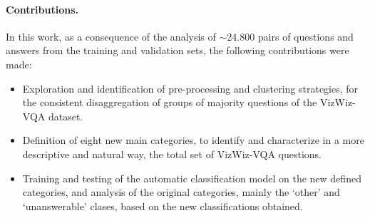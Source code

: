 \paragraph{\textbf{Contributions.}}
In this work, as a consequence of the analysis of $\sim$24.800 pairs of questions and answers from the training and validation sets, the following contributions were made:
\begin{itemize}
    \item Exploration and identification of pre-processing and clustering strategies, for the consistent disaggregation of groups of majority questions of the VizWiz-VQA dataset.
    \item Definition of eight new main categories, to identify and characterize in a more descriptive and natural way, the total set of VizWiz-VQA questions.
    \item Training and testing of the automatic classification model on the new defined categories, and analysis of the original categories, mainly the `other' and `unanswerable'  clases, based on the new classifications obtained.
\end{itemize}